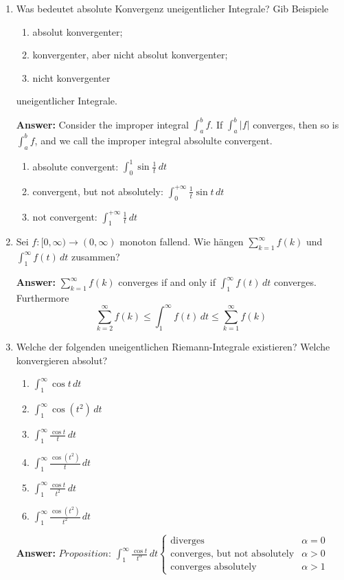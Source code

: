 \documentclass[11pt]{article}
\newcommand{\abs}[1]{\left|#1\right|}
\begin{document}
\begin{enumerate}
    \item Was bedeutet absolute Konvergenz uneigentlicher Integrale? Gib Beispiele
    \begin{enumerate}
        \item absolut konvergenter;
        \item konvergenter, aber nicht absolut konvergenter;
        \item nicht konvergenter
    \end{enumerate} uneigentlicher Integrale.

    \textbf{Answer:} Consider the improper integral $\int_a^b f$. If $\int_a^b\abs{f}$ converges, then so is $\int_a^b f$, and we call the improper integral absolulte convergent.

    \begin{enumerate}
        \item absolute convergent: $\int_0^1 \sin{\frac{1}{t}}\,dt$
        \item convergent, but not absolutely: $\int_0^{+\infty}\frac{1}{t}\sin{t}\,dt$
        \item not convergent: $\int_1^{+\infty} \frac{1}{t}\,dt$
    \end{enumerate}


    \item Sei $f: [0, \infty) \to (0, \infty)$ monoton fallend. Wie hängen $\sum_{k=1}^\infty f(k)$ und $\int_1^\infty f(t)\,dt$ zusammen?

    \textbf{Answer:} $\sum_{k=1}^\infty f(k)$ converges if and only if $\int_1^\infty f(t)\,dt$ converges. Furthermore  $$\sum_{k=2}^\infty f(k) \le \int_1^\infty f(t)\,dt \le \sum_{k=1}^\infty f(k)$$
    \item Welche der folgenden uneigentlichen Riemann-Integrale existieren? Welche konvergieren absolut?
    \begin{enumerate}
        \item $\int_1^\infty \cos{t}\,dt$
        \item $\int_1^\infty \cos{(t^2)}\,dt$
        \item $\int_1^\infty \frac{\cos{t}}{t} \,dt$
        \item $\int_1^\infty \frac{\cos{(t^2)}}{t} \,dt$
        \item $\int_1^\infty \frac{\cos{t}}{t^2} \,dt$
        \item $\int_1^\infty \frac{\cos{(t^2)}}{t^2} \,dt$
    \end{enumerate}

    \textbf{Answer:} $\textit{Proposition}$: $\int_1^\infty \frac{\cos{t}}{t^\alpha}\,dt \begin{cases}
        \text{diverges}&\alpha = 0\\
        \text{converges, but not absolutely}&\alpha > 0\\
        \text{converges absolutely}&\alpha > 1
    \end{cases}$


\end{enumerate}
\end{document}
